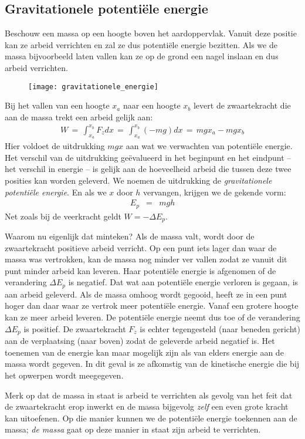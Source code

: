 \documentclass{ximera}
\begin{document}
	\author{Bart Lambregs}


	\subsection{Gravitationele potenti\"ele energie}\label{gravitationele potentiele energie}

	Beschouw een massa op een hoogte boven het aardoppervlak. Vanuit deze positie kan ze arbeid verrichten en zal ze dus potenti\"ele energie bezitten. Als we de massa bijvoorbeeld laten vallen kan ze op de grond een nagel inslaan en dus arbeid verrichten.
	\begin{figure}[h]
	\begin{center}
	\texttt{[image: gravitationele\_energie]}
	\end{center}
	\end{figure}
	Bij het vallen van een hoogte $x_a$ naar een hoogte $x_b$ levert de zwaartekracht die aan de massa trekt een arbeid gelijk aan:
	\begin{eqnarray*}
	W\,=\,\int_{x_a}^{x_b}F_zdx\,=\,\int_{x_a}^{x_b}(-mg)dx\,=\,mgx_a-mgx_b
	\end{eqnarray*}
	Hier voldoet de uitdrukking $mgx$ aan wat we verwachten van potenti\"ele ener\-gie. Het verschil van de uitdrukking ge\"evalueerd in het beginpunt en het eindpunt -- het verschil in energie -- is gelijk aan de hoeveelheid arbeid die tussen deze twee posities kan worden geleverd. We noemen de uitdrukking de \textit{gravitationele potenti\"ele energie}. En als we $x$ door $h$ vervangen, krijgen we de gekende vorm:
	\begin{eqnarray}
	E_p&=&mgh\label{Ep=mgh}
	\end{eqnarray}
	Net zoals bij de veerkracht geldt $W=-\Delta E_p$. 
	
	Waarom nu eigenlijk dat minteken? Als de massa valt, wordt door de zwaartekracht positieve arbeid verricht. Op een punt iets lager dan waar de massa was vertrokken, kan de massa nog minder ver vallen zodat ze vanuit dit punt minder arbeid kan leveren. Haar potenti\"ele energie is afgenomen of de verandering $\Delta E_p$ is negatief. Dat wat aan potenti\"ele energie verloren is gegaan, is aan arbeid geleverd. Als de massa omhoog wordt gegooid, heeft ze in een punt hoger dan daar waar ze vertrok meer potenti\"ele energie. Vanaf een grotere hoogte kan ze meer arbeid leveren. De potenti\"ele energie neemt dus toe of de verandering $\Delta E_p$ is positief. De zwaartekracht $F_z$ is echter tegengesteld (naar beneden gericht) aan de verplaatsing (naar boven) zodat de geleverde arbeid negatief is. Het toenemen van de energie kan maar mogelijk zijn als van elders energie aan de massa wordt gegeven. In dit geval is ze afkomstig van de kinetische energie die bij het opwerpen wordt meegegeven.
	
	Merk op dat de massa in staat is arbeid te verrichten als gevolg van het feit dat de zwaartekracht erop inwerkt en de massa bijgevolg \textit{zelf} een even grote kracht kan uitoefenen. Op die manier kunnen we de potenti\"ele energie toekennen aan de massa; \textit{de massa} gaat op deze manier in staat zijn arbeid te verrichten.
	
\end{document}
